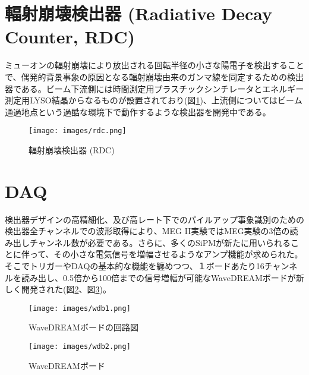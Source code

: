 \documentclass[Yonemoto_master.tex]{subfiles}
\begin{document}
\section{輻射崩壊検出器 (Radiative Decay Counter, RDC)}
\label{sec: rdc}
ミューオンの輻射崩壊により放出される回転半径の小さな陽電子を検出することで、偶発的背景事象の原因となる輻射崩壊由来のガンマ線を同定するための検出器である。ビーム下流側には時間測定用プラスチックシンチレータとエネルギー測定用LYSO結晶からなるものが設置されており(図\ref{fig: RDC})、上流側についてはビーム通過地点という過酷な環境下で動作するような検出器を開発中である。
\begin{figure}[h]
\begin{center}
\texttt{[image: images/rdc.png]}
\caption{輻射崩壊検出器 (RDC)}
\label{fig: RDC}
\end{center}
\end{figure}

\section{DAQ}
検出器デザインの高精細化、及び高レート下でのパイルアップ事象識別のための検出器全チャンネルでの波形取得により、MEG II実験ではMEG実験の3倍の読み出しチャンネル数が必要である。さらに、多くのSiPMが新たに用いられることに伴って、その小さな電気信号を増幅させるようなアンプ機能が求められた。そこでトリガーやDAQの基本的な機能を纏めつつ、１ボードあたり16チャンネルを読み出し、0.5倍から100倍までの信号増幅が可能なWaveDREAMボードが新しく開発された\cite{wdb}(図\ref{fig: wdb1}、図\ref{fig: wdb2})。
\begin{figure}[h]
        \centering
        \texttt{[image: images/wdb1.png]}
        \caption{WaveDREAMボードの回路図}
        \label{fig: wdb1}
\end{figure}
\begin{figure}
        \centering
        \texttt{[image: images/wdb2.png]}
        \caption{WaveDREAMボード}
        \label{fig: wdb2}
\end{figure}

{  }{
\begin{thebibliography}{99}
\end{thebibliography}
}
\end{document}
